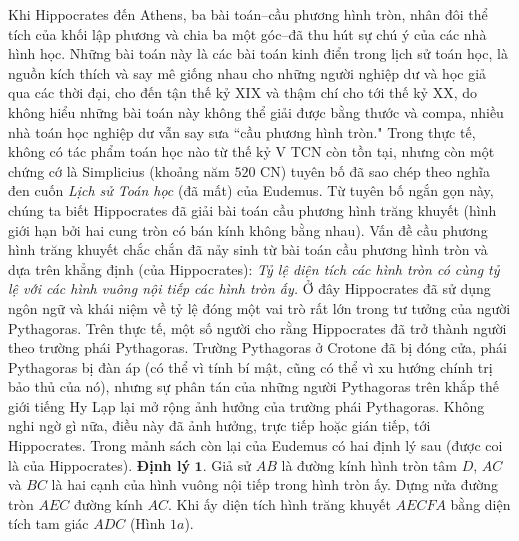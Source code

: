\begin{multicols}{2}
	\vskip 0.05cm
	Khi Hippocrates đến Athens, ba bài toán--cầu phương hình tròn, nhân đôi thể tích của khối lập phương và chia ba một góc--đã thu hút sự chú ý của các nhà hình học. Những bài toán này là các bài toán kinh điển trong lịch sử toán học, là  nguồn kích thích và say mê giống nhau cho những người nghiệp dư và học giả qua các thời đại, cho đến tận thế kỷ XIX và thậm chí cho tới thế kỷ XX, do không hiểu những bài toán này không thể giải được bằng thước và compa, nhiều nhà toán học nghiệp dư vẫn say sưa ``cầu phương hình tròn."
	\vskip 0.05cm
	Trong thực tế, không có tác phẩm toán học nào từ thế kỷ V TCN còn tồn tại, nhưng còn một chứng cớ là Simplicius (khoảng năm $520$ CN) tuyên bố đã sao chép theo nghĩa đen cuốn  \textit{Lịch sử Toán học} (đã mất) của Eudemus. Từ tuyên bố ngắn gọn này, chúng ta biết Hippocrates đã giải bài toán cầu phương hình trăng khuyết (hình giới hạn bởi hai cung tròn có bán kính không bằng nhau). Vấn đề cầu phương hình trăng khuyết chắc chắn đã nảy sinh từ bài toán cầu phương hình tròn và dựa trên khẳng định (của Hippocrates): \textit{Tỷ lệ diện tích các hình tròn có cùng tỷ lệ với các hình vuông nội tiếp các hình tròn ấy.}
	\vskip 0.05cm
	Ở đây Hippocrates đã sử dụng ngôn ngữ và khái niệm về tỷ lệ đóng một vai trò rất lớn trong tư tưởng của người Pythagoras. Trên thực tế, một số người cho rằng Hippocrates đã trở thành người theo trường phái Pythagoras. Trường Pythagoras ở Crotone đã bị đóng cửa, phái Pythagoras bị đàn áp (có thể vì tính bí mật, cũng có thể vì xu hướng chính trị bảo thủ của nó), nhưng sự phân tán của những người Pythagoras trên khắp thế giới tiếng Hy Lạp lại mở rộng ảnh hưởng của trường phái Pythagoras. Không nghi ngờ gì nữa, điều này đã ảnh hưởng, trực tiếp hoặc gián tiếp, tới Hippocrates.
	\vskip 0.05cm
	Trong mảnh sách còn lại của Eudemus có hai định lý sau (được coi là của Hippocrates). 
	\vskip 0.05cm
	\textbf{\color{lichsutoanhoc}Định lý} $\pmb{1.}$ Giả sử $AB$  là đường kính hình tròn tâm  $D$, $AC$  và $BC$  là hai cạnh của  hình vuông nội tiếp trong hình tròn ấy. Dựng nửa đường tròn $AEC$  đường kính  $AC$. Khi ấy diện tích hình trăng khuyết $AECFA$  bằng diện tích tam giác  $ADC$ (Hình $1a$).
	\begin{figure}[H]
		\centering
		\captionsetup{labelformat= empty, justification=centering}
\end{figure}
\end{multicols}
